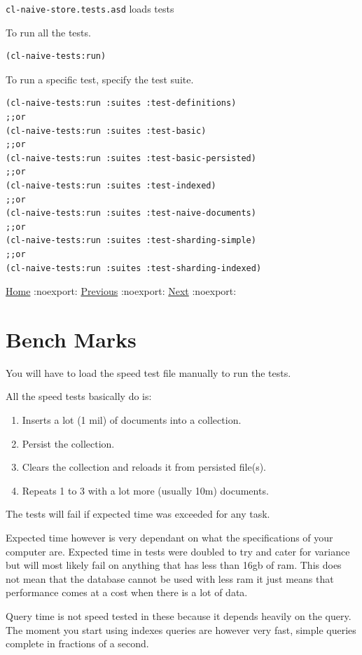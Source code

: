 \documentclass[11pt]{article}
\begin{document}
\texttt{cl-naive-store.tests.asd} loads tests

To run all the tests.

\begin{verbatim}
(cl-naive-tests:run)
\end{verbatim}

To run a specific test, specify the test suite.

\begin{verbatim}
(cl-naive-tests:run :suites :test-definitions)
;;or
(cl-naive-tests:run :suites :test-basic)
;;or
(cl-naive-tests:run :suites :test-basic-persisted)
;;or
(cl-naive-tests:run :suites :test-indexed)
;;or
(cl-naive-tests:run :suites :test-naive-documents)
;;or
(cl-naive-tests:run :suites :test-sharding-simple)
;;or
(cl-naive-tests:run :suites :test-sharding-indexed)
\end{verbatim}

\href{home.org}{Home} :noexport: \href{utils.org}{Previous} :noexport: \href{rough-bench-marks.org}{Next} :noexport:
\section{Bench Marks}
\label{sec:orgc8d88c2}

You will have to load the speed test file manually to run the tests.

All the speed tests basically do is:

\begin{enumerate}
\item Inserts a lot (1 mil) of documents into a collection.
\item Persist the collection.
\item Clears the collection and reloads it from persisted file(s).
\item Repeats 1 to 3 with a lot more (usually 10m) documents.
\end{enumerate}

The tests will fail if expected time was exceeded for any task.

Expected time however is very dependant on what the specifications of
your computer are. Expected time in tests were doubled to try and
cater for variance but will most likely fail on anything that has less
than 16gb of ram. This does not mean that the database cannot be used
with less ram it just means that performance comes at a cost when
there is a lot of data.

Query time is not speed tested in these because it depends heavily on
the query. The moment you start using indexes queries are however very
fast, simple queries complete in fractions of a second.
\end{document}
